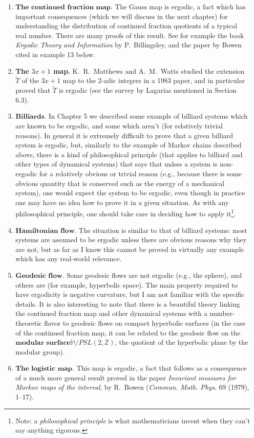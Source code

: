 \begin{enumerate}[label=\arabic*.]
\item $\textbf{The continued fraction map.}$ The Gauss map
is ergodic, a fact which has important consequences
(which we will discuss in the next chapter) for
understanding the distribution of continued fraction
quotients of a typical real number. There are many
proofs of this result. See for example the book
\emph{Ergodic Theory and Information} by P.\ Billingsley,
and the paper by Bowen cited in example 13 below.

\item \textbf{The $3x+1$ map.} K.\ R.\ Matthews and A.\ M.\ Watts
studied the extension $\tilde{T}$ of the $3x+1$ map
to the $2$-adic integers in a 1983 paper, and in
particular proved that $\tilde{T}$ is ergodic (see
the survey by Lagarias mentioned in Section 6.3).

\item $\textbf{Billiards.}$ In Chapter 5 we described some
example of billiard systems which are known to be
ergodic, and some which aren't (for relatively trivial
reasons). In general it is extremely difficult to
prove that a given billiard system is ergodic, but,
similarly to the example of Markov chains described
above, there is a kind of philosophical principle
(that applies to billiard and other types of dynamical
systems) that says that unless a system is non-ergodic
for a relatively obvious or trivial reason (e.g.,
because there is some obvious quantity that is
conserved such as the energy of a mechanical system),
one would expect the system to be ergodic, even though
in practice one may have no idea how to prove it in a
given situation. As with any philosophical principle,
one should take care in deciding how to apply
it\footnote{Note: a \emph{philosophical principle} is what
mathematicians invent when they can't say anything
rigorous.}.

\item $\textbf{Hamiltonian flow.}$ The situation is similar
to that of billiard systems: most systems are assumed
to be ergodic unless there are obvious reasons why
they are not, but as far as I know this cannot be
proved in virtually any example which has any
real-world relevance.

\item $\textbf{Geodesic flow.}$ Some geodesic flows are not
ergodic (e.g., the sphere), and others are (for
example, hyperbolic space). The main property required
to have ergodicity is negative curvature, but I am not
familiar with the specific details. It is also
interesting to note that there is a beautiful theory
linking the continued fraction map and other dynamical
systems with a number-theoretic flavor to geodesic
flows on compact hyperbolic surfaces (in the case of
the continued fraction map, it can be related to the
geodesic flow on the $\textbf{modular surface}$$\mathbb{H}/PSL(2,\mathbb{Z})$, the quotient of the
hyperbolic plane by the modular group).

\item $\textbf{The logistic map.}$ This map is ergodic, a
fact that follows as a consequence of a much more
general result proved in the paper \emph{Invariant measures
for Markov maps of the interval}, by R.\ Bowen
(\emph{Commun. Math. Phys.} 69 (1979), 1--17).
\end{enumerate}


